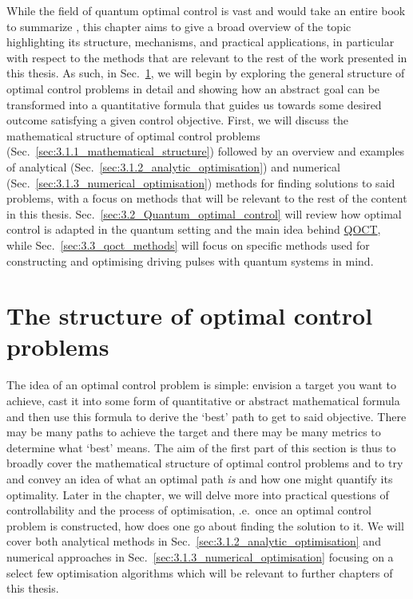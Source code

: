 \documentclass[a4paper,oneside,11pt]{book}
\newcommand{\acrref}[1]{\hyperref[acr:#1]{#1}}
\begin{document}
While the field of quantum optimal control is vast and would take an entire book to summarize \cite{dalessio_quantum_2016}, this chapter aims to give a broad overview of the topic highlighting its structure, mechanisms, and practical applications, in particular with respect to the methods that are relevant to the rest of the work presented in this thesis. As such, in Sec.~\ref{sec:3.1_structure_quantum_control}, we will begin by exploring the general structure of optimal control problems in detail and showing how an abstract goal can be transformed into a quantitative formula that guides us towards some desired outcome satisfying a given control objective. First, we will discuss the mathematical structure of optimal control problems (Sec.~\ref{sec:3.1.1_mathematical_structure}) followed by an overview and examples of analytical (Sec.~\ref{sec:3.1.2_analytic_optimisation}) and numerical (Sec.~\ref{sec:3.1.3_numerical_optimisation}) methods for finding solutions to said problems, with a focus on methods that will be relevant to the rest of the content in this thesis. Sec.~\ref{sec:3.2_Quantum_optimal_control} will review how optimal control is adapted in the quantum setting and the main idea behind \acrref{QOCT}, while Sec.~\ref{sec:3.3_qoct_methods} will focus on specific methods used for constructing and optimising driving pulses with quantum systems in mind.

\section{The structure of optimal control problems}\label{sec:3.1_structure_quantum_control}

The idea of an optimal control problem is simple: envision a target you want to achieve, cast it into some form of quantitative or abstract mathematical formula and then use this formula to derive the `best' path to get to said objective. There may be many paths to achieve the target and there may be many metrics to determine what `best' means. The aim of the first part of this section is thus to broadly cover the mathematical structure of optimal control problems and to try and convey an idea of what an optimal path \emph{is} and how one might quantify its optimality. Later in the chapter, we will delve more into practical questions of controllability and the process of optimisation, \@i.e.~once an optimal control problem is constructed, how does one go about finding the solution to it. We will cover both analytical methods in Sec.~\ref{sec:3.1.2_analytic_optimisation} and numerical approaches in Sec.~\ref{sec:3.1.3_numerical_optimisation} focusing on a select few optimisation algorithms which will be relevant to further chapters of this thesis. 
\end{document}
